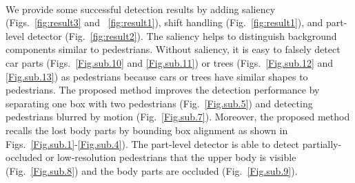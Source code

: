 \documentclass[journal]{IEEEtran}
\begin{document}
\begin{figure*}[t]
\centering
{} \\
\quad
{}\quad
{}
\caption{Successful detection results by the proposed method. The left and right images show the detection results of Basic (without saliency) and Proposed (with "Saliency + Shift Handling"), respectively. Blue box: Basic detection result. Green box: Proposed detection result.}
\label{fig:result1}
\end{figure*}

We provide some successful detection results by adding saliency (Figs.~\ref{fig:result3} and ~\ref{fig:result1}), shift handling (Fig.~\ref{fig:result1}), and part-level detector (Fig.~\ref{fig:result2}). The saliency helps to distinguish background components similar to pedestrians. Without saliency, it is easy to falsely detect car parts (Figs.~\ref{Fig.sub.10} and \ref{Fig.sub.11}) or trees (Figs.~\ref{Fig.sub.12} and \ref{Fig.sub.13}) as pedestrians because cars or trees have similar shapes to pedestrians. The proposed method improves the detection performance by separating one box with two pedestrians (Fig.~\ref{Fig.sub.5}) and detecting pedestrians blurred by motion (Fig.~\ref{Fig.sub.7}). Moreover, the proposed method recalls the lost body parts by bounding box alignment as shown in Figs.~\ref{Fig.sub.1}-\ref{Fig.sub.4}). The part-level detector is able to detect partially-occluded or low-resolution pedestrians that the upper body is visible (Fig.~\ref{Fig.sub.8}) and the body parts are occluded (Fig.~\ref{Fig.sub.9}).
\end{document}
